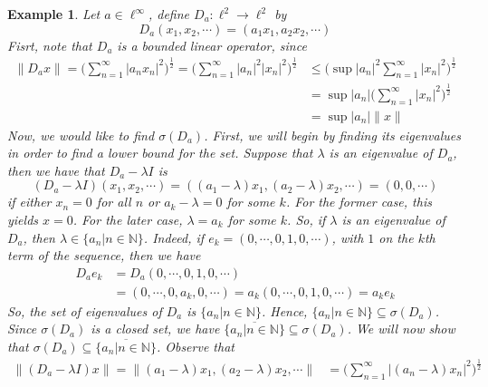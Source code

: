 \documentclass{report}
\newtheorem{exm}{Example}
\begin{document}
\begin{exm}
  Let $a\in\ell^{\infty}$, define $D_{a}:\ell^{2}\to\ell^{2}$ by
  $$
  D_{a}(x_{1},x_{2},\cdots)=(a_{1}x_{1},a_{2}x_{2},\cdots)
  $$
  Fisrt, note that $D_{a}$ is a bounded linear operator, since
  $$
  \begin{aligned}
    \|D_{a}x\|=\Big(\sum^{\infty}_{n=1}|a_{n}x_{n}|^{2}\Big)^{\frac{1}{2}}=\Big(\sum^{\infty}_{n=1}|a_{n}|^{2}|x_{n}|^{2}\Big)^{\frac{1}{2}}&\leq\Big(\sup|a_{n}|^{2}\sum^{\infty}_{n=1}|x_{n}|^{2}\Big)^{\frac{1}{2}}\\
                                                                                                                                            &=\sup|a_{n}|\Big(\sum^{\infty}_{n=1}|x_{n}|^{2}\Big)^{\frac{1}{2}}\\
                                                                                                                                            &=\sup|a_{n}|\|x\|
  \end{aligned}
  $$
  Now, we would like to find $\sigma(D_{a})$. First, we will begin by finding its eigenvalues in order to find a lower bound for the set. Suppose that $\lambda$ is an eigenvalue of $D_{a}$, then we have that $D_{a}-\lambda I$ is
  $$
  (D_{a}-\lambda I)(x_{1},x_{2},\cdots)=((a_{1}-\lambda)x_{1},(a_{2}-\lambda)x_{2},\cdots)=(0,0,\cdots)
  $$
  if either $x_{n}=0$ for all $n$ or $a_{k}-\lambda=0$ for some $k$. For the former case, this yields $x=0$. For the later case, $\lambda=a_{k}$ for some $k$. So, if $\lambda$ is an eigenvalue of $D_{a}$, then $\lambda\in\{a_{n}|n\in\mathbb{N}\}$. Indeed, if $e_{k}=(0,\cdots,0,1,0,\cdots)$, with $1$ on the $k$th term of the sequence, then we have
  $$
  \begin{aligned}
    D_{a}e_{k}&=D_{a}(0,\cdots,0,1,0,\cdots)\\
              &=(0,\cdots,0,a_{k},0,\cdots)=a_{k}(0,\cdots,0,1,0,\cdots)=a_{k}e_{k}
  \end{aligned}
  $$
  So, the set of eigenvalues of $D_{a}$ is $\{a_{n}|n\in\mathbb{N}\}$. Hence, $\{a_{n}|n\in\mathbb{N}\}\subseteq\sigma(D_{a})$. Since $\sigma(D_{a})$ is a closed set, we have $\overline{\{a_{n}|n\in\mathbb{N}\}}\subseteq\sigma(D_{a})$.
  \newline
  We will now show that $\sigma(D_{a})\subseteq\overline{\{a_{n}|n\in\mathbb{N}\}}$. Observe that
  $$
  \begin{aligned}
    \|(D_{a}-\lambda I)x\|=\|(a_{1}-\lambda)x_{1},(a_{2}-\lambda)x_{2},\cdots\|&=\Big(\sum^{\infty}_{n=1}|(a_{n}-\lambda)x_{n}|^{2}\Big)^{\frac{1}{2}}\\

\end{aligned}$$
\end{exm}
\end{document}
